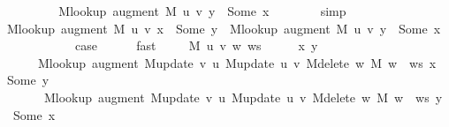 \begin{isabellebody}
\ \ \ \ \isamarkupfalse%
\ \isamarkupfalse%
\ {\isachardoublequoteopen}{\isachardot}{\kern0pt}{\isachardot}{\kern0pt}{\isachardot}{\kern0pt}\ {\isasymlongleftrightarrow}\ M{\isacharunderscore}{\kern0pt}lookup\ {\isacharparenleft}{\kern0pt}augment\ M\ {\isacharbrackleft}{\kern0pt}u{\isacharcomma}{\kern0pt}\ v{\isacharbrackright}{\kern0pt}{\isacharparenright}{\kern0pt}\ y\ {\isacharequal}{\kern0pt}\ Some\ x{\isachardoublequoteclose}\isanewline
\ \ \ \ \ \ \isamarkupfalse%
\ simp\isanewline
\ \ \ \ \isamarkupfalse%
\ \isamarkupfalse%
\ {\isachardoublequoteopen}M{\isacharunderscore}{\kern0pt}lookup\ {\isacharparenleft}{\kern0pt}augment\ M\ {\isacharbrackleft}{\kern0pt}u{\isacharcomma}{\kern0pt}\ v{\isacharbrackright}{\kern0pt}{\isacharparenright}{\kern0pt}\ x\ {\isacharequal}{\kern0pt}\ Some\ y\ {\isasymlongleftrightarrow}\ M{\isacharunderscore}{\kern0pt}lookup\ {\isacharparenleft}{\kern0pt}augment\ M\ {\isacharbrackleft}{\kern0pt}u{\isacharcomma}{\kern0pt}\ v{\isacharbrackright}{\kern0pt}{\isacharparenright}{\kern0pt}\ y\ {\isacharequal}{\kern0pt}\ Some\ x{\isachardoublequoteclose}\isanewline
\ \ \ \ \ \ \isacommand{{\isachardot}{\kern0pt}}\isamarkupfalse%
\ \isacommand{{\isacharbraceright}{\kern0pt}}\isamarkupfalse%
\isanewline
\ \ \isamarkupfalse%
\ {\isacharquery}{\kern0pt}case\isanewline
\ \ \ \ \isamarkupfalse%
\ fast\isanewline
{}\isamarkupfalse%
\isanewline
\ \ \isamarkupfalse%
\ {\isacharparenleft}{\kern0pt}{}\ M\ u\ v\ w\ ws{\isacharparenright}{\kern0pt}\isanewline
\ \ \isacommand{{\isacharbraceleft}{\kern0pt}}\isamarkupfalse%
\ \isamarkupfalse%
\ x\ y\isanewline
\ \ \ \ \isamarkupfalse%
\isanewline
\ \ \ \ \ \ {\isachardoublequoteopen}M{\isacharunderscore}{\kern0pt}lookup\ {\isacharparenleft}{\kern0pt}augment\ {\isacharparenleft}{\kern0pt}M{\isacharunderscore}{\kern0pt}update\ v\ u\ {\isacharparenleft}{\kern0pt}M{\isacharunderscore}{\kern0pt}update\ u\ v\ {\isacharparenleft}{\kern0pt}M{\isacharunderscore}{\kern0pt}delete\ w\ M{\isacharparenright}{\kern0pt}{\isacharparenright}{\kern0pt}{\isacharparenright}{\kern0pt}\ {\isacharparenleft}{\kern0pt}w\ {\isacharhash}{\kern0pt}\ ws{\isacharparenright}{\kern0pt}{\isacharparenright}{\kern0pt}\ x\ {\isacharequal}{\kern0pt}\ Some\ y\ {\isasymlongleftrightarrow}\isanewline
\ \ \ \ \ \ \ M{\isacharunderscore}{\kern0pt}lookup\ {\isacharparenleft}{\kern0pt}augment\ {\isacharparenleft}{\kern0pt}M{\isacharunderscore}{\kern0pt}update\ v\ u\ {\isacharparenleft}{\kern0pt}M{\isacharunderscore}{\kern0pt}update\ u\ v\ {\isacharparenleft}{\kern0pt}M{\isacharunderscore}{\kern0pt}delete\ w\ M{\isacharparenright}{\kern0pt}{\isacharparenright}{\kern0pt}{\isacharparenright}{\kern0pt}\ {\isacharparenleft}{\kern0pt}w\ {\isacharhash}{\kern0pt}\ ws{\isacharparenright}{\kern0pt}{\isacharparenright}{\kern0pt}\ y\ {\isacharequal}{\kern0pt}\ Some\ x{\isachardoublequoteclose}\isanewline

\end{isabellebody}
